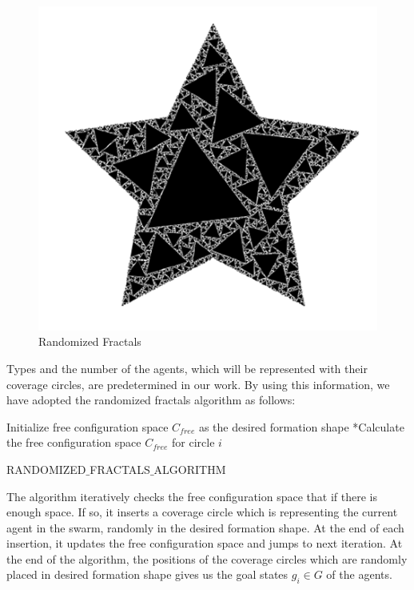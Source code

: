 \begin{figure}[H]
\caption{Randomized Fractals \cite{26}}
\centering
\includegraphics[scale = 0.60]{randomized}
\end{figure}
	
Types and the number of the agents, which will be represented with their coverage circles, are predetermined in our work. By using this information, we have adopted the randomized fractals algorithm as follows:
		
\begin{algorithm}[H]
Initialize free configuration space $C_{free}$ as the desired formation shape \newline
{}
{		
*Calculate the free configuration space $C_{free}$ for circle $i$\;
}\												
\caption{RANDOMIZED$\_$FRACTALS$\_$ALGORITHM} 
\end{algorithm}
		
The algorithm iteratively checks the free configuration space that if there is enough space. If so, it inserts a coverage circle which is representing the current agent in the swarm, randomly in the desired formation shape. At the end of each insertion, it updates the free configuration space and jumps to next iteration. At the end of the algorithm, the positions of the coverage circles which are randomly placed in desired formation shape gives us the goal states $g_i \in G$  of the agents. 
	
